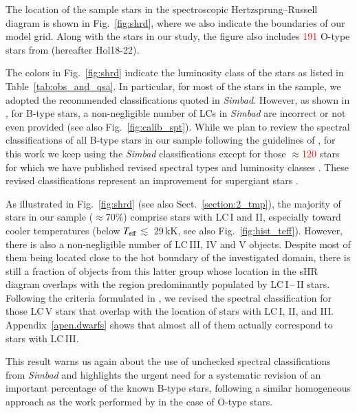 \documentclass{aa}
\newcommand{\Teff}{\mbox{$T_{\rm eff}$}\xspace}
\newcommand{\num}[1]{\textcolor{red}{#1}}
\newcommand{\ls}{\mbox{$\lesssim$}\,}
\begin{document}
The location of the sample stars in the spectroscopic Hertzsprung–Russell diagram \citep[hereafter sHR diagram][]{langer14} is shown in Fig.~\ref{fig:shrd}, where we also indicate the boundaries of our model grid. Along with the stars in our study, the figure also includes \num{191} O-type stars from \citet{holgado18, holgado20, holgado22} (hereafter Hol18-22).

The colors in Fig.~\ref{fig:shrd} indicate the luminosity class of the stars as listed in Table~\ref{tab:obs_and_qsa}. In particular, for most of the stars in the sample, we adopted the recommended classifications quoted in \textit{Simbad}. However, as shown in \citet{deburgos23}, for B-type stars, a non-negligible number of LCs in \textit{Simbad} are incorrect or not even provided (see also Fig.~\ref{fig:calib_spt}). While we plan to review the spectral classifications of all B-type stars in our sample following the guidelines of \citet{negueruela-subm}, for this work we keep using the \textit{Simbad} classifications except for those $\approx$\num{120} stars for which we have published revised spectral types and luminosity classes \citep[see][]{deburgos20, deburgos23, negueruela-subm}. These revised classifications represent an improvement for supergiant stars \citep[see for comparison Fig.~5 in][]{deburgos23}.

As illustrated in Fig.~\ref{fig:shrd} (see also Sect.~\ref{section:2_tmp}), the majority of stars in our sample ($\approx$70\%) comprise stars with LC\,I and II, especially toward cooler temperatures (below \Teff\ls\,29\,kK, see also Fig.~\ref{fig:hist_teff}). However, there is also a non-negligible number of LC\,III, IV and V objects. Despite most of them being located close to the hot boundary of the investigated domain, there is still a fraction of objects from this latter group whose location in the sHR diagram overlaps with the region predominantly populated by LC\,I\,--\,II stars. Following the criteria formulated in \citet{negueruela-subm}, we revised the spectral classification for those LC\,V stars that overlap with the location of stars with LC\,I, II, and III. Appendix~\ref{apen.dwarfs} shows that almost all of them actually correspond to stars with LC\,III.

This result warns us again about the use of unchecked spectral classifications from \textit{Simbad} and highlights the urgent need for a systematic revision of an important percentage of the known B-type stars, following a similar homogeneous approach as the work performed by \citet{maiz-apellaniz11, maiz-apellaniz16, sota11, sota14} in the case of O-type stars.
\end{document}
